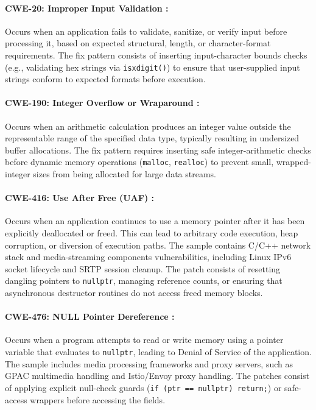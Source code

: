 \paragraph{CWE-20: Improper Input Validation :}
Occurs when an application fails to validate, sanitize, or verify input before processing it, based on expected structural, length, or character-format requirements.
The fix pattern consists of inserting input-character bounds checks (e.g., validating hex strings via \texttt{isxdigit()}) to ensure that user-supplied input strings conform to expected formats before execution.

\paragraph{CWE-190: Integer Overflow or Wraparound :}
Occurs when an arithmetic calculation produces an integer value outside the representable range of the specified data type, typically resulting in undersized buffer allocations.
The fix pattern requires inserting safe integer-arithmetic checks before dynamic memory operations (\texttt{malloc}, \texttt{realloc}) to prevent small, wrapped-integer sizes from being allocated for large data streams.

\paragraph{CWE-416: Use After Free (UAF) :}
Occurs when an application continues to use a memory pointer after it has been explicitly deallocated or freed. 
This can lead to arbitrary code execution, heap corruption, or diversion of execution paths.
The sample contains C/C++ network stack and media-streaming components vulnerabilities, including Linux IPv6 socket lifecycle and SRTP session cleanup. 
The patch consists of resetting dangling pointers to \texttt{nullptr}, managing reference counts, or ensuring that asynchronous destructor routines do not access freed memory blocks.

\paragraph{CWE-476: NULL Pointer Dereference :}
Occurs when a program attempts to read or write memory using a pointer variable that evaluates to \texttt{nullptr}, leading to Denial of Service of the application.
The sample includes media processing frameworks and proxy servers, such as GPAC multimedia handling and Istio/Envoy proxy handling. 
The patches consist of applying explicit null-check guards (\texttt{if (ptr == nullptr) return;}) or safe-access wrappers before accessing the fields.
